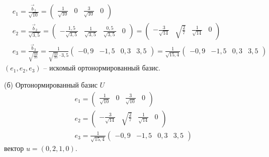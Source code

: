 	\begin{align*}
	&e_1 = \frac{\vec b_1}{\sqrt{10}} = \begin{pmatrix} \frac{1}{\sqrt{10}} & 0 & \frac{3}{\sqrt{10}} & 0 \end{pmatrix} \\
	&e_2 = \frac{\vec b_2}{\sqrt{3,5}} = \begin{pmatrix} -\frac{1,5}{\sqrt{3,5}} & \frac{1}{\sqrt{3,5}} & \frac{0,5}{\sqrt{3,5}} & 0 \end{pmatrix} = \begin{pmatrix} -\frac{3}{\sqrt{14}} & \sqrt{\frac{2}{7}} & \frac{1}{\sqrt{14}} & 0 \end{pmatrix}\\
	&e_3 = \frac{\vec b_3}{\sqrt{\frac{44}{35}}}= \frac{1}{\sqrt{\frac{44}{35}} \cdot 3,5}\begin{pmatrix} -0,9 & -1,5 & 0,3 & 3,5 \end{pmatrix} = \frac{1}{\sqrt{15,4}}\begin{pmatrix} -0,9 & -1,5 & 0,3 & 3,5 \end{pmatrix}
	\end{align*}
	$(e_1, e_2, e_3)$ -- искомый ортонормированный базис.
	
	(б) Ортонормированный базис $U$ 
	\begin{align*}
	&e_1 = \begin{pmatrix} \frac{1}{\sqrt{10}} & 0 & \frac{3}{\sqrt{10}} & 0 \end{pmatrix} \\
	&e_2 = \begin{pmatrix} -\frac{3}{\sqrt{14}} & \sqrt{\frac{2}{7}} & \frac{1}{\sqrt{14}} & 0 \end{pmatrix}\\
	&e_3 = \frac{1}{\sqrt{15,4}}\begin{pmatrix} -0,9 & -1,5 & 0,3 & 3,5 \end{pmatrix}
	\end{align*}
	вектор $u = (0,2,1,0)$.
	
